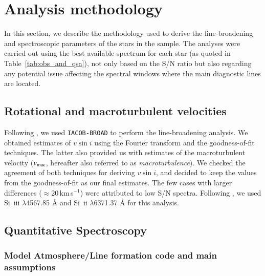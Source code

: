 \documentclass{aa}
\newcommand{\vsini}{\mbox{$v\sin i$}\xspace}
\newcommand{\vmac} {$v_{\rm mac}$\xspace}
\let\oldAA\AA
\renewcommand*{\AA}{\,\oldAA\xspace}
\newcommand{\kms}{\,\mbox{km\,s$^{-1}$}\xspace}
\begin{document}
\section{Analysis methodology}
\label{section:3_tmp}

In this section, we describe the methodology used to derive the line-broadening and spectroscopic parameters of the stars in the sample. The analyses were carried out using the best available spectrum for each star (as quoted in Table~\ref{tab:obs_and_qsa}), not only based on the S/N ratio but also regarding any potential issue affecting the spectral windows where the main diagnostic lines are located. 




\subsection{Rotational and macroturbulent velocities}
\label{subsection:31_tmp}

Following \citet{simon-diaz14a}, we used {\tt IACOB-BROAD} to perform the line-broadening analysis. We obtained estimates of \vsini using the Fourier transform and the goodness-of-fit techniques. The latter also provided us with estimates of the macroturbulent velocity (\vmac, hereafter also referred to as {\em macroturbulence}). We checked the agreement of both techniques for deriving \vsini, and decided to keep the values from the goodness-of-fit as our final estimates. The few cases with larger differences ($\approx$20\kms) were attributed to low S/N spectra. Following \citet{deburgos23}, we used Si~{\sc iii} $\lambda$4567.85\,{\AA} and Si~{\sc ii} $\lambda$6371.37\,{\AA} for this analysis.




\subsection{Quantitative Spectroscopy}
\label{subsection:32_tmp}


\subsubsection{Model Atmosphere/Line formation code and main assumptions}
\label{subsubsection:321_tmp}
\end{document}
